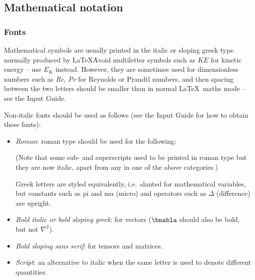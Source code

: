 \subsection{Mathematical notation}
\subsubsection{Fonts}
Mathematical symbols are usually printed in the italic or sloping greek
type normally produced by \LaTeX\.  Avoid multiletter symbols such as
$KE$ for kinetic energy -- use $E_{K}$ instead. However, they are
sometimes used for dimensionless numbers such as {\it Re, Pr} for Reynolds 
or Prandtl numbers, and then spacing between the two letters should 
be smaller than in normal \LaTeX\ maths mode -- see the Input Guide.

Non-italic fonts should be used as follows (see the Input Guide for
how to obtain these fonts):
\begin{itemize}
\item
{\em Roman\/}: roman type should be used for the following:

(Note that some sub- and superscripts used to be printed in roman type
but they are now italic, apart from any in one of the above
categories.)

Greek letters are styled equivalently, i.e.\ slanted for mathematical
variables, but constants such as pi and mu (micro) and operators such as $\Delta$ (difference) are upright. 
\item
{\em Bold italic or bold sloping greek\/}: for vectors
($\bnabla$ should also be bold, but not $\nabla^{2}$).
\item
{\em Bold sloping sans serif\/}: for tensors and matrices.
\item
{\em Script\/}: an alternative to italic when the same letter is used
to denote different quantities.
\end{itemize}

